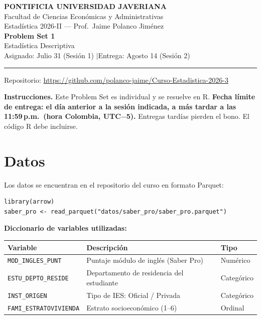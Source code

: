 \documentclass[11pt, a4paper]{article}
\begin{document}
\begin{center}
{\large\bfseries PONTIFICIA UNIVERSIDAD JAVERIANA}\\[3pt]
Facultad de Ciencias Econ\'omicas y Administrativas\\[2pt]
Estad\'istica 2026-II --- Prof.\ Jaime Polanco Jim\'enez\\[6pt]
{\LARGE\bfseries Problem Set 1}\\[3pt]
{\large Estad\'istica Descriptiva}\\[6pt]
Asignado: Julio 31 (Sesi\'on 1) \quad$|$\quad Entrega: Agosto 14 (Sesi\'on 2)
\end{center}

\vspace{6pt}
\rule{\linewidth}{0.5pt}
\vspace{2pt}
{\centering\small Repositorio: \url{https://github.com/polanco-jaime/Curso-Estadistica-2026-3}\par}
\vspace{6pt}

\textbf{Instrucciones.} Este Problem Set es individual y se resuelve en R.
\textbf{Fecha l\'imite de entrega: el d\'ia anterior a la sesi\'on indicada, a m\'as tardar a las 11:59\,p.m.\ (hora Colombia, UTC$-$5).} Entregas tard\'ias pierden el bono. El c\'odigo R debe incluirse.

\section*{Datos}

Los datos se encuentran en el repositorio del curso en formato Parquet:

\begin{lstlisting}
library(arrow)
saber_pro <- read_parquet("datos/saber_pro/saber_pro.parquet")
\end{lstlisting}

\textbf{Diccionario de variables utilizadas:}

\vspace{4pt}
\begin{tabular}{l l l}
\toprule
\textbf{Variable} & \textbf{Descripci\'on} & \textbf{Tipo} \\
\midrule
\texttt{MOD\_INGLES\_PUNT}       & Puntaje m\'odulo de ingl\'es (Saber Pro) & Num\'erico \\
\texttt{ESTU\_DEPTO\_RESIDE}     & Departamento de residencia del estudiante & Categ\'orico \\
\texttt{INST\_ORIGEN}            & Tipo de IES: Oficial / Privada & Categ\'orico \\
\texttt{FAMI\_ESTRATOVIVIENDA}   & Estrato socioecon\'omico (1--6) & Ordinal \\
\bottomrule
\end{tabular}
\end{document}
